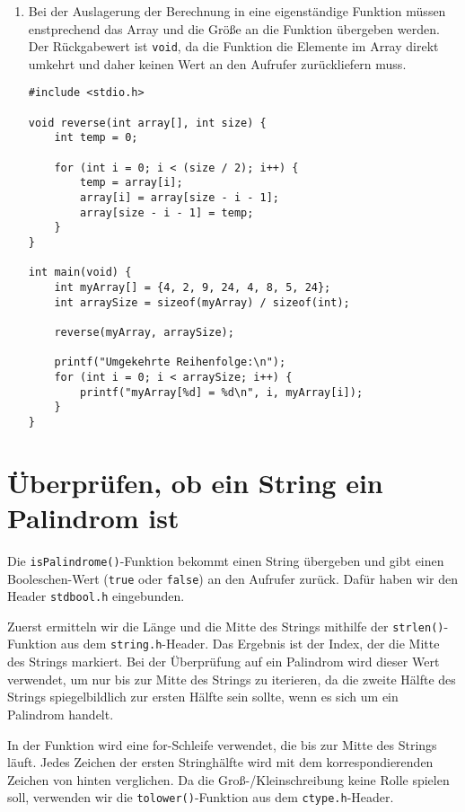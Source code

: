 \begin{enumerate}
\item Bei der Auslagerung der Berechnung in eine eigenständige Funktion müssen
enstprechend das Array und die Größe an die Funktion übergeben werden. Der
Rückgabewert ist \texttt{void}, da die Funktion die Elemente im Array
direkt umkehrt und daher keinen Wert an den Aufrufer zurückliefern muss.

\begin{verbatim}
#include <stdio.h>

void reverse(int array[], int size) {
    int temp = 0;

    for (int i = 0; i < (size / 2); i++) {
        temp = array[i];
        array[i] = array[size - i - 1];
        array[size - i - 1] = temp;
    }
}

int main(void) {
    int myArray[] = {4, 2, 9, 24, 4, 8, 5, 24};
    int arraySize = sizeof(myArray) / sizeof(int);

    reverse(myArray, arraySize);

    printf("Umgekehrte Reihenfolge:\n");
    for (int i = 0; i < arraySize; i++) {
        printf("myArray[%d] = %d\n", i, myArray[i]);
    }
}
\end{verbatim}

\end{enumerate}




\chapter{Überprüfen, ob ein String ein Palindrom ist}

Die \texttt{isPalindrome()}-Funktion bekommt einen String übergeben und
gibt einen Booleschen-Wert (\texttt{true} oder \texttt{false}) an
den Aufrufer zurück. Dafür haben wir den Header \texttt{stdbool.h}
eingebunden.

Zuerst ermitteln wir die Länge und die Mitte des Strings mithilfe der
\texttt{strlen()}-Funktion aus dem \texttt{string.h}-Header. Das
Ergebnis ist der Index, der die Mitte des Strings markiert. Bei der Überprüfung
auf ein Palindrom wird dieser Wert verwendet, um nur bis zur Mitte des Strings
zu iterieren, da die zweite Hälfte des Strings spiegelbildlich zur ersten Hälfte
sein sollte, wenn es sich um ein Palindrom handelt.

In der Funktion wird eine for-Schleife verwendet, die bis zur Mitte des Strings
läuft. Jedes Zeichen der ersten Stringhälfte wird mit dem korrespondierenden
Zeichen von hinten verglichen. Da die Groß-/Kleinschreibung keine Rolle spielen
soll, verwenden wir die \texttt{tolower()}-Funktion aus dem
\texttt{ctype.h}-Header.

